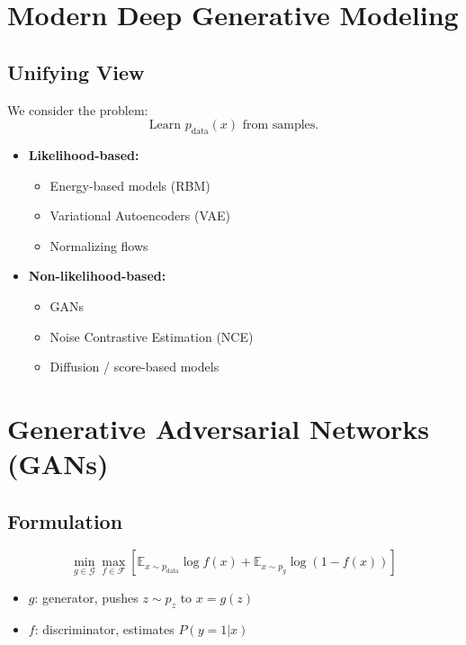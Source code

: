 \documentclass[12pt,oneside]{book}
\numberwithin{equation}{section}
\theoremstyle{definition}
\theoremstyle{plain}
\theoremstyle{remark}
\begin{document}
\section{Modern Deep Generative Modeling}

\subsection{Unifying View}

We consider the problem:
\[
\text{Learn } p_{\text{data}}(x) \text{ from samples.}
\]

\begin{itemize}
    \item \textbf{Likelihood-based:}
    \begin{itemize}
        \item Energy-based models (RBM)
        \item Variational Autoencoders (VAE)
        \item Normalizing flows
    \end{itemize}
    \item \textbf{Non-likelihood-based:}
    \begin{itemize}
        \item GANs
        \item Noise Contrastive Estimation (NCE)
        \item Diffusion / score-based models
    \end{itemize}
\end{itemize}

\section{Generative Adversarial Networks (GANs)}

\subsection{Formulation}

\[
\min_{g \in \mathcal{G}} \max_{f \in \mathcal{F}} 
\left[
\mathbb{E}_{x \sim p_{\text{data}}} \log f(x)
+ \mathbb{E}_{x \sim p_g} \log(1 - f(x))
\right]
\]

\begin{itemize}
    \item $g$: generator, pushes $z \sim p_z$ to $x = g(z)$
    \item $f$: discriminator, estimates $P(y=1|x)$
\end{itemize}
\end{document}

